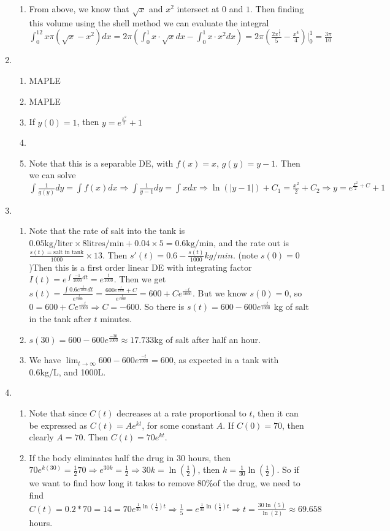 \documentclass[10pt,english]{article}
\begin{document}
\begin{enumerate}
\begin{enumerate}
    \item From above, we know that $\sqrt{x}$ and $x^2$ intersect at $0$ and $1$. Then finding this volume using the shell method we can evaluate the integral $\int_0^12x\pi(\sqrt{x}-x^2)dx=2\pi\left(\int_0^1x\cdot\sqrt{x}dx-\int_0^1x\cdot x^2dx\right)=2\pi(\frac{2x^\frac{5}{2}}{5}-\frac{x^4}{4})|_0^1=\frac{3\pi}{10}$
\end{enumerate}
\pagebreak
\item \begin{enumerate}
    \item MAPLE
    \item MAPLE
    \item If $y(0)=1$, then $y=e^{\frac{x^2}{2}}+1$
    \item 
    \item Note that this is a separable DE, with $f(x)=x$, $g(y)=y-1$. Then we can solve $\int\frac{1}{g(y)}dy=\int f(x)dx\Rightarrow \int \frac{1}{y-1}dy=\int xdx\Rightarrow \ln(|y-1|)+C_1=\frac{x^2}{2}+C_2\Rightarrow y=e^{\frac{x^2}{2}+C}+1$
\end{enumerate}
\pagebreak
\item \begin{enumerate}
    \item Note that the rate of salt into the tank is $0.05\text{kg/liter}\times 8\text{litres/min}+0.04\times 5=0.6\text{kg/min}$, and the rate out is $\frac{s(t)=\text{salt in tank}}{1000}\times 13$. Then $s'(t)=0.6-\frac{s(t)}{1000}kg/min$. (note $s(0)=0$)Then this is a first order linear DE with integrating factor $I(t)=e^{\int\frac{-1}{1000}dt}=e^\frac{t}{1000}$. Then we get $s(t)=\frac{\int 0.6e^\frac{t}{1000}dt}{e^\frac{t}{1000}}=\frac{600e^\frac{t}{1000}+C}{e^\frac{t}{1000}}=600+Ce^\frac{-t}{1000}$. But we know $s(0)=0$, so $0=600+Ce^\frac{-t}{1000}\Rightarrow C=-600$. So there is $s(t)=600-600e^\frac{-t}{1000}$ kg of salt in the tank after $t$ minutes.
    \item $s(30)=600-600e^\frac{-30}{1000}\approx 17.733$kg of salt after half an hour.
    \item We have $\lim_{t\rightarrow\infty}600-600e^\frac{-t}{1000}=600$, as expected in a tank with 0.6kg/L, and 1000L.  
\end{enumerate}

\pagebreak
\item \begin{enumerate}
    \item Note that since $C(t)$ decreases at a rate proportional to $t$, then it can be expressed as $C(t)=Ae^{kt}$, for some constant $A$. If $C(0)=70$, then clearly $A=70$. Then $C(t)=70e^{kt}$. 
    \item If the body eliminates half the drug in 30 hours, then $70e^{k(30)}=\frac{1}{2}70\Rightarrow e^{30k}=\frac{1}{2}\Rightarrow 30k=\ln\left(\frac{1}{2}\right)$, then $k=\frac{1}{30}\ln\left(\frac{1}{2}\right)$. So if we want to find how long it takes to remove 80\%of the drug, we need to find $C(t)=0.2*70=14=70e^{\frac{1}{30}\ln\left(\frac{1}{2}\right)t}\Rightarrow \frac{1}{5}=e^{\frac{1}{30}\ln\left(\frac{1}{2}\right)t}\Rightarrow t=\frac{30\ln(5)}{\ln(2)}\approx 69.658$ hours. 
\end{enumerate}


\end{enumerate}
\end{document}
